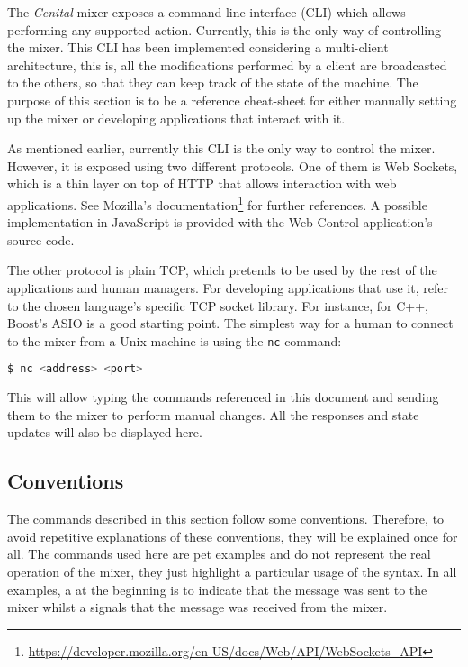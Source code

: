 \documentclass[../main.tex]{subfiles}
\begin{document}
The \textit{Cenital} mixer exposes a command line interface (CLI) which allows performing any supported action. Currently, this is the only way of controlling the mixer. This CLI has been implemented considering a multi-client architecture, this is, all the modifications performed by a client are broadcasted to the others, so that they can keep track of the state of the machine. The purpose of this section is to be a reference cheat-sheet for either manually setting up the mixer or developing applications that interact with it.\newline

As mentioned earlier, currently this CLI is the only way to control the mixer. However, it is exposed using two different protocols. One of them is Web Sockets, which is a thin layer on top of HTTP that allows interaction with web applications. See Mozilla's documentation\footnote{\url{https://developer.mozilla.org/en-US/docs/Web/API/WebSockets_API}} for further references. A possible implementation in JavaScript is provided with the Web Control application's source code.\newline

The other protocol is plain TCP, which pretends to be used by the rest of the applications and human managers. For developing applications that use it, refer to the chosen language's specific TCP socket library. For instance, for C++, Boost's ASIO is a good starting point. The simplest way for a human to connect to the mixer from a Unix machine is using the \texttt{nc} command:

\begin{lstlisting}[language=bash]
  $ nc <address> <port>
\end{lstlisting}

This will allow typing the commands referenced in this document and sending them to the mixer to perform manual changes. All the responses and state updates will also be displayed here.

\subsection{Conventions}

The commands described in this section follow some conventions. Therefore, to avoid repetitive explanations of these conventions, they will be explained once for all. The commands used here are pet examples and do not represent the real operation of the mixer, they just highlight a particular usage of the syntax. In all examples, a \textquote{+} at the beginning is to indicate that the message was sent to the mixer whilst a \textquote{-} signals that the message was received from the mixer.\newline
\end{document}
